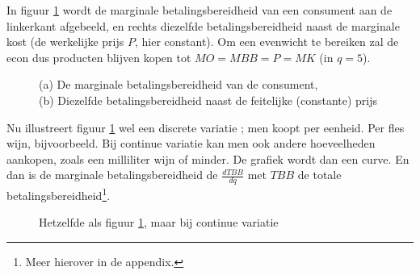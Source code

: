 \par In figuur \ref{fig:plot1} wordt de marginale betalingsbereidheid van een consument aan de linkerkant afgebeeld, en rechts diezelfde betalingsbereidheid naast de marginale kost (de werkelijke prijs $P$, hier constant). Om een evenwicht te bereiken zal de econ dus producten blijven kopen tot $MO=MBB=P=MK$ (in $q=5$).

\begin{figure}
\centering
\captionsetup{justification=centering,margin=2cm}
\caption{(a) De marginale betalingsbereidheid van de consument, \\(b) Diezelfde betalingsbereidheid naast de feitelijke (constante) prijs}
\label{fig:plot1}
\end{figure}

\par Nu illustreert figuur \ref{fig:plot1} wel een discrete variatie ; men koopt per eenheid. Per fles wijn, bijvoorbeeld. Bij continue variatie kan men ook andere hoeveelheden aankopen, zoals een milliliter wijn of minder. De grafiek wordt dan een curve. En dan is de marginale betalingsbereidheid de  $\frac{dTBB}{dq}$ met $TBB$ de totale betalingsbereidheid\footnote{Meer hierover in de appendix.}.

\begin{figure}
\vspace{0.5cm}
\centering
\captionsetup{justification=centering,margin=2cm}
\caption{Hetzelfde als figuur \ref{fig:plot1}, maar bij continue variatie}
\label{fig:plot2}
\end{figure}

